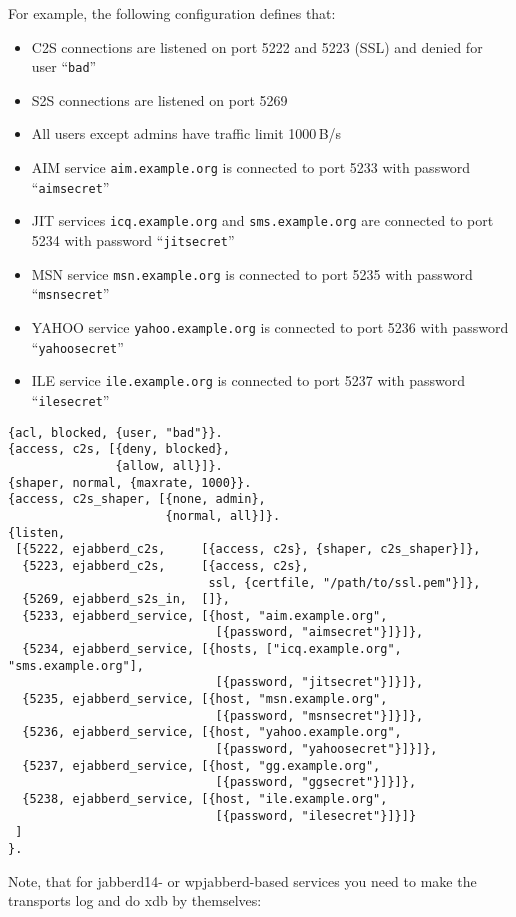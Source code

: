 \documentclass[10pt]{article}
\begin{document}
For example, the following configuration defines that:
\begin{itemize}
\item C2S connections are listened on port 5222 and 5223 (SSL) and denied for
  user ``\texttt{bad}''
\item S2S connections are listened on port 5269
\item All users except admins have traffic limit 1000\,B/s
\item AIM service \texttt{aim.example.org} is connected to port 5233 with
  password ``\texttt{aimsecret}''
\item JIT services \texttt{icq.example.org} and \texttt{sms.example.org} are
  connected to port 5234 with password ``\texttt{jitsecret}''
\item MSN service \texttt{msn.example.org} is connected to port 5235 with
  password ``\texttt{msnsecret}''
\item YAHOO service \texttt{yahoo.example.org} is connected to port 5236 with
  password ``\texttt{yahoosecret}''
\item ILE service \texttt{ile.example.org} is connected to port 5237 with
  password ``\texttt{ilesecret}''
\end{itemize}
\begin{verbatim}
{acl, blocked, {user, "bad"}}.
{access, c2s, [{deny, blocked},
               {allow, all}]}.
{shaper, normal, {maxrate, 1000}}.
{access, c2s_shaper, [{none, admin},
                      {normal, all}]}.
{listen,
 [{5222, ejabberd_c2s,     [{access, c2s}, {shaper, c2s_shaper}]},
  {5223, ejabberd_c2s,     [{access, c2s},
                            ssl, {certfile, "/path/to/ssl.pem"}]},
  {5269, ejabberd_s2s_in,  []},
  {5233, ejabberd_service, [{host, "aim.example.org",
                             [{password, "aimsecret"}]}]},
  {5234, ejabberd_service, [{hosts, ["icq.example.org", "sms.example.org"],
                             [{password, "jitsecret"}]}]},
  {5235, ejabberd_service, [{host, "msn.example.org",
                             [{password, "msnsecret"}]}]},
  {5236, ejabberd_service, [{host, "yahoo.example.org",
                             [{password, "yahoosecret"}]}]},
  {5237, ejabberd_service, [{host, "gg.example.org",
                             [{password, "ggsecret"}]}]},
  {5238, ejabberd_service, [{host, "ile.example.org",
                             [{password, "ilesecret"}]}]}
 ]
}.
\end{verbatim}
Note, that for jabberd14- or wpjabberd-based services you need to make the
transports log and do xdb by themselves:
\end{document}
